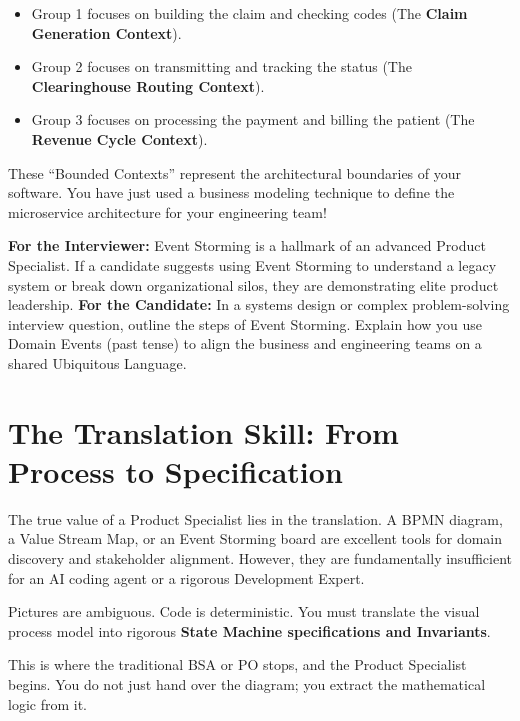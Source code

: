 \documentclass[
  11pt,
  openany,
  oneside]{book}
\providecommand{\tightlist}{%
  \setlength{\itemsep}{0pt}\setlength{\parskip}{0pt}}
\renewenvironment{quote}{\begin{customquote}}{\end{customquote}}
\begin{document}
\begin{itemize}
\tightlist
\item
  Group 1 focuses on building the claim and checking codes (The
  \textbf{Claim Generation Context}).
\item
  Group 2 focuses on transmitting and tracking the status (The
  \textbf{Clearinghouse Routing Context}).
\item
  Group 3 focuses on processing the payment and billing the patient (The
  \textbf{Revenue Cycle Context}).
\end{itemize}

These ``Bounded Contexts'' represent the architectural boundaries of
your software. You have just used a business modeling technique to
define the microservice architecture for your engineering team!

\begin{quote}
\textbf{For the Interviewer:} Event Storming is a hallmark of an
advanced Product Specialist. If a candidate suggests using Event
Storming to understand a legacy system or break down organizational
silos, they are demonstrating elite product leadership. \textbf{For the
Candidate:} In a systems design or complex problem-solving interview
question, outline the steps of Event Storming. Explain how you use
Domain Events (past tense) to align the business and engineering teams
on a shared Ubiquitous Language.
\end{quote}

\bigskip

\section{The Translation Skill: From Process to
Specification}\label{the-translation-skill-from-process-to-specification}

The true value of a Product Specialist lies in the translation. A BPMN
diagram, a Value Stream Map, or an Event Storming board are excellent
tools for domain discovery and stakeholder alignment. However, they are
fundamentally insufficient for an AI coding agent or a rigorous
Development Expert.

Pictures are ambiguous. Code is deterministic. You must translate the
visual process model into rigorous \textbf{State Machine specifications
and Invariants}.

This is where the traditional BSA or PO stops, and the Product
Specialist begins. You do not just hand over the diagram; you extract
the mathematical logic from it.
\end{document}
